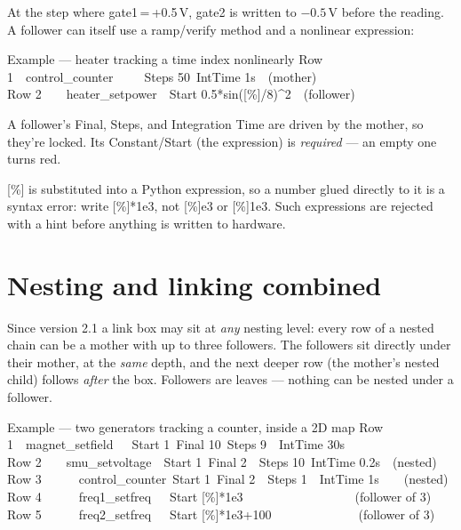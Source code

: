 \documentclass[11pt,a4paper]{article}
\newcommand{\code}[1]{{\ttfamily\color{qcode}#1}}
\begin{document}
\noindent At the step where \code{gate1}\,=\,+0.5\,V, \code{gate2} is written
to $-0.5$\,V before the reading. A follower can itself use a ramp/verify
method and a nonlinear expression:

\begin{gridex}{Example --- heater tracking a time index nonlinearly}
Row 1\ \ control\_counter\ \ \ \ \ Steps 50\ IntTime 1s\ \ (mother)\\
Row 2\ \ \ \ heater\_setpower\ \ Start 0.5*sin([\%]/8)\textasciicircum 2\ \ (follower)
\end{gridex}

\begin{tip}
A follower's Final, Steps, and Integration Time are driven by the mother, so
they're locked. Its Constant/Start (the expression) is \emph{required} --- an
empty one turns red.
\end{tip}

\begin{warn}
\code{[\%]} is substituted into a Python expression, so a number glued
directly to it is a syntax error: write \code{[\%]*1e3}, not
\code{[\%]e3} or \code{[\%]1e3}. Such expressions are rejected with a hint
before anything is written to hardware.
\end{warn}

\section{Nesting and linking combined}\label{sec:nestlink}

Since version 2.1 a link box may sit at \emph{any} nesting level: every row
of a nested chain can be a mother with up to three followers. The followers
sit directly under their mother, at the \emph{same} depth, and the next
deeper row (the mother's nested child) follows \emph{after} the box.
Followers are leaves --- nothing can be nested under a follower.

\begin{gridex}{Example --- two generators tracking a counter, inside a 2D map}
Row 1\ \ magnet\_setfield\ \ \ Start 1\ Final 10\ Steps 9\ \ IntTime 30s\\
Row 2\ \ \ \ smu\_setvoltage\ \ Start 1\ Final 2\ \ Steps 10\ IntTime 0.2s\ \ (nested)\\
Row 3\ \ \ \ \ \ control\_counter\ Start 1\ Final 2\ \ Steps 1\ \ IntTime 1s\ \ \ \ (nested)\\
Row 4\ \ \ \ \ \ freq1\_setfreq\ \ \ Start [\%]*1e3\ \ \ \ \ \ \ \ \ \ \ \ \ \ \ \ \ \ (follower of 3)\\
Row 5\ \ \ \ \ \ freq2\_setfreq\ \ \ Start [\%]*1e3+100\ \ \ \ \ \ \ \ \ \ \ \ \ \ (follower of 3)
\end{gridex}
\end{document}
